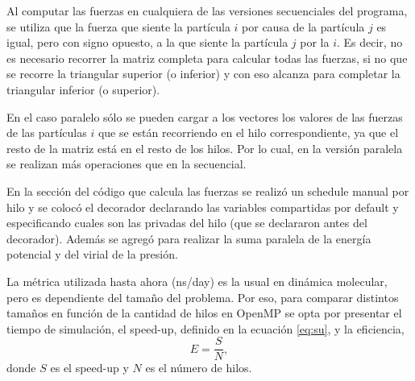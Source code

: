 \documentclass[a4paper,spanish,12pt,twoside]{article}
\begin{document}
Al computar las fuerzas en cualquiera de las versiones secuenciales del programa, se utiliza que la fuerza que siente la partícula $i$ por causa de la partícula $j$ es igual, pero con signo opuesto, a la que siente la partícula $j$ por la $i$. Es decir, no es necesario recorrer la matriz completa para calcular todas las fuerzas, si no que se recorre la triangular superior (o inferior) y con eso alcanza para completar la triangular inferior (o superior).

En el caso paralelo sólo se pueden cargar a los vectores los valores de las fuerzas de las partículas $i$ que se están recorriendo en el hilo correspondiente, ya que el resto de la matriz está en el resto de los hilos. Por lo cual, en la versión paralela se realizan más operaciones que en la secuencial.

En la sección del código que calcula las fuerzas se realizó un schedule manual por hilo y se colocó el decorador  declarando las variables compartidas por default y especificando cuales son las privadas del hilo (que se declararon antes del decorador). Además se agregó  para realizar la suma paralela de la energía potencial y del virial de la presión.

La métrica utilizada hasta ahora (ns/day) es la usual en dinámica molecular, pero es dependiente del tamaño del problema. Por eso, para comparar distintos tamaños en función de la cantidad de hilos en OpenMP se opta por presentar el tiempo de simulación, el speed-up, definido en la ecuación \ref{eq:su}, y la eficiencia,
$$
E = \frac{S}{N},
$$
donde $S$ es el speed-up y $N$ es el número de hilos.
\end{document}
